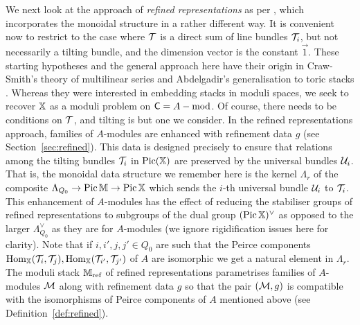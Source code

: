 \documentclass[12pt]{amsart}
\begin{document}
We next look at the approach of {\em refined representations} as per \cite{AU}, which incorporates the monoidal structure in a rather different way. It is convenient now to restrict to the case where $\mathcal{T}$ is a direct sum of line bundles $\mathcal{T}_i$, but not necessarily a tilting bundle, and the dimension vector is the constant $\vec{1}$. These starting hypotheses and the general approach here have their origin in Craw-Smith's \cite{Craw-Smith} theory of multilinear series and Abdelgadir's generalisation to toric stacks \cite{Abd}. Whereas they were interested in embedding stacks in moduli spaces, we seek to recover $\mathbb{X}$ as a moduli problem on ${\sf C} = A-\text{mod}$. Of course, there needs to be conditions on $\mathcal{T}$, and tilting is but one we consider.
In the refined representations approach, families of $A$-modules are enhanced with refinement data $g$ (see Section~\ref{sec:refined}). 
This data is designed precisely to ensure that relations among the tilting bundles $\mathcal{T}_i$ in $\operatorname{Pic}(\mathbb{X})$ are preserved by the universal bundles $\mathcal{U}_i$.
That is, the monoidal data structure we remember here is the kernel $\Lambda_r$ of the composite $\Lambda_{Q_0} \to \operatorname{Pic} \mathbb{M} \to \operatorname{Pic} \mathbb{X}$ which sends the $i$-th universal bundle $\mathcal{U}_i$ to $\mathcal{T}_i$.
This enhancement of $A$-modules has the effect of reducing the stabiliser groups of refined representations to subgroups of the dual group $(\operatorname{Pic} \mathbb{X})^\vee$ as opposed to the larger $\Lambda_{Q_0}^\vee$ as they are for $A$-modules (we ignore rigidification issues here for clarity).
Note that if $i,i',j,j' \in Q_0$ are such that the Peirce components $\operatorname{Hom}_{\mathbb{X}}(\mathcal{T}_i,\mathcal{T}_j), \operatorname{Hom}_{\mathbb{X}}(\mathcal{T}_{i'},\mathcal{T}_{j'})$ of $A$ are isomorphic we get a natural element in $\Lambda_r$.
The moduli stack $\mathbb{M}_{\textup{ref}}$ of refined representations parametrises families of $A$-modules $\mathcal{M}$ along with refinement data $g$ so that the pair $(\mathcal{M},g)$ is compatible with the isomorphisms of Peirce components of $A$ mentioned above (see Definition~\ref{def:refined}).
\end{document}
